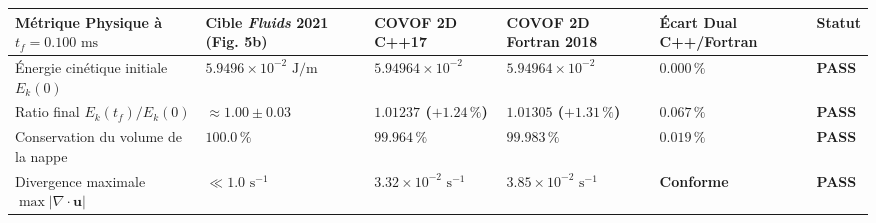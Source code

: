 \documentclass[
  10pt,
]{article}
\newcounter{none} %
\begin{document}
{\def\LTcaptype{none} %
\begin{longtable}[]{@{}
  >{\raggedright\arraybackslash}p{}
  >{\centering\arraybackslash}p{}
  >{\centering\arraybackslash}p{}
  >{\centering\arraybackslash}p{}
  >{\centering\arraybackslash}p{}
  >{\centering\arraybackslash}p{}@{}}
\toprule\noalign{}
\begin{minipage}[b]{\linewidth}\raggedright
Métrique Physique à \(t_f = 0.100\text{ ms}\)
\end{minipage} & \begin{minipage}[b]{\linewidth}\centering
Cible \emph{Fluids} 2021 (Fig. 5b)
\end{minipage} & \begin{minipage}[b]{\linewidth}\centering
COVOF 2D C++17
\end{minipage} & \begin{minipage}[b]{\linewidth}\centering
COVOF 2D Fortran 2018
\end{minipage} & \begin{minipage}[b]{\linewidth}\centering
Écart Dual C++/Fortran
\end{minipage} & \begin{minipage}[b]{\linewidth}\centering
Statut
\end{minipage} \\
\midrule\noalign{}
\endhead
\bottomrule\noalign{}
\endlastfoot
Énergie cinétique initiale \(E_k(0)\) &
\(5.9496 \times 10^{-2}\text{ J/m}\) &
\textbf{\(5.94964 \times 10^{-2}\)} &
\textbf{\(5.94964 \times 10^{-2}\)} & \textbf{\(0.000\,\%\)} &
\textbf{PASS} \\
Ratio final \(E_k(t_f) / E_k(0)\) & \(\approx 1.00 \pm 0.03\) &
\textbf{\(1.01237\) (\(+1.24\,\%\))} & \textbf{\(1.01305\)
(\(+1.31\,\%\))} & \textbf{\(0.067\,\%\)} & \textbf{PASS} \\
Conservation du volume de la nappe & \(100.0\,\%\) &
\textbf{\(99.964\,\%\)} & \textbf{\(99.983\,\%\)} &
\textbf{\(0.019\,\%\)} & \textbf{PASS} \\
Divergence maximale \(\max|\nabla\cdot\mathbf{u}|\) &
\(\ll 1.0\text{ s}^{-1}\) &
\textbf{\(3.32 \times 10^{-2}\text{ s}^{-1}\)} &
\textbf{\(3.85 \times 10^{-2}\text{ s}^{-1}\)} & \textbf{Conforme} &
\textbf{PASS} \\
\end{longtable}
}
\end{document}
